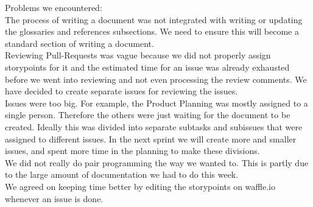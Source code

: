 \documentclass[11pt,a4paper,landscape]{article}
\begin{document}
Problems we encountered:\\
The process of writing a document was not integrated with writing or updating the glossaries and references subsections. We need to ensure this will become a standard section of writing a document.\\
Reviewing Pull-Requests was vague because we did not properly assign storypoints for it and the estimated time for an issue was already exhausted before we went into reviewing and not even processing the review comments.
We have decided to create separate issues for reviewing the issues.\\
Issues were too big. For example, the Product Planning was mostly assigned to a single person. Therefore the others were just waiting for the document to be created. Ideally this was divided into separate subtasks and subissues that were assigned to different issues. In the next sprint we will create more and smaller issues, and spent more time in the planning to make these divisions.\\
We did not really do pair programming the way we wanted to. This is partly due to the large amount of documentation we had to do this week. \\
We agreed on keeping time better by editing the storypoints on waffle.io whenever an issue is done.
\end{document}
